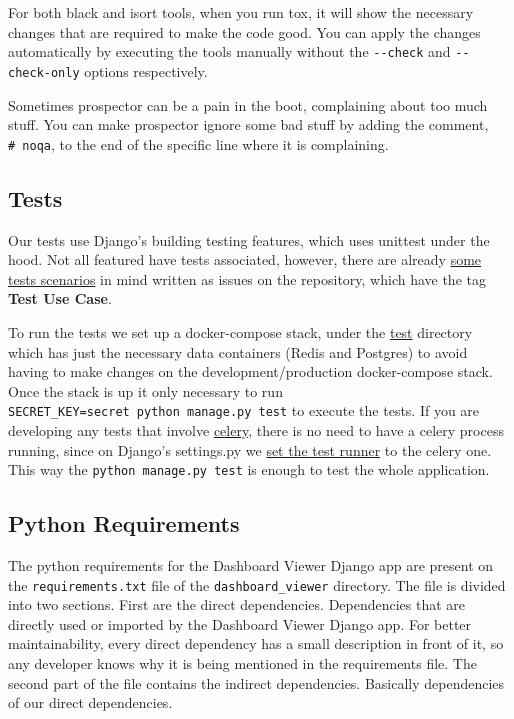 \documentclass[
]{book}
\begin{document}
For both black and isort tools, when you run tox, it will show the necessary changes that are required to make the code good.
You can apply the changes automatically by executing the tools manually without the \texttt{-\/-check} and \texttt{-\/-check-only} options respectively.

Sometimes prospector can be a pain in the boot, complaining about too much stuff.
You can make prospector ignore some bad stuff by adding the comment, \texttt{\#\ noqa}, to the end of the specific line where it is complaining.

\hypertarget{tests}{%
\subsection*{Tests}\label{tests}}

Our tests use Django's building testing features, which uses unittest under the hood.
Not all featured have tests associated, however, there are already \href{https://github.com/EHDEN/NetworkDashboards/issues?q=is\%3Aissue+is\%3Aopen+label\%3A\%22Test+Use+Case\%22}{some tests scenarios} in mind written as issues on the repository, which have the tag \textbf{Test Use Case}.

To run the tests we set up a docker-compose stack, under the \href{https://github.com/EHDEN/NetworkDashboards/tree/master/tests}{test} directory which has just the necessary data containers (Redis and Postgres) to avoid having to make changes on the development/production docker-compose stack.
Once the stack is up it only necessary to run \texttt{SECRET\_KEY=secret\ python\ manage.py\ test} to execute the tests.
If you are developing any tests that involve \href{https://github.com/celery/celery}{celery}, there is no need to have a celery process running, since on Django's settings.py we \href{https://github.com/EHDEN/NetworkDashboards/blob/master/dashboard_viewer/dashboard_viewer/settings.py\#L316}{set the test runner} to the celery one.
This way the \texttt{python\ manage.py\ test} is enough to test the whole application.

\hypertarget{python-requirements}{%
\subsection*{Python Requirements}\label{python-requirements}}

The python requirements for the Dashboard Viewer Django app are present on the \texttt{requirements.txt} file of the \texttt{dashboard\_viewer} directory.
The file is divided into two sections.
First are the direct dependencies.
Dependencies that are directly used or imported by the Dashboard Viewer Django app.
For better maintainability, every direct dependency has a small description in front of it, so any developer knows why it is being mentioned in the requirements file.
The second part of the file contains the indirect dependencies.
Basically dependencies of our direct dependencies.
\end{document}
